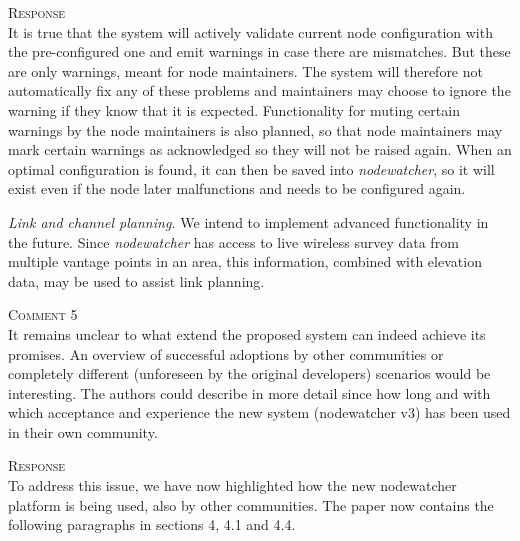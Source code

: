 \documentclass[12pt,twoside,a4paper]{report}
\newcommand{\nodewatcher}{\textit{nodewatcher}}
\begin{document}
\vspace{0.5cm}\noindent\textsc{Response}\\
It is true that the system will actively validate current node configuration with the pre-configured one and emit warnings in case there are mismatches.
But these are only warnings, meant for node maintainers.
The system will therefore not automatically fix any of these problems and maintainers may choose to ignore the warning if they know that it is expected.
Functionality for muting certain warnings by the node maintainers is also planned, so that node maintainers may mark certain warnings as acknowledged so they will not be raised again.
When an optimal configuration is found, it can then be saved into \nodewatcher{}, so it will exist even if the node later malfunctions and needs to be configured again.

\textit{Link and channel planning.} We intend to implement advanced functionality in the future.
Since \nodewatcher{} has access to live wireless survey data from multiple vantage points in an area, this information, combined with elevation data, may be used to assist link planning.

\vspace{0.5cm}\noindent\textsc{Comment 5}\\
It remains unclear to what extend the proposed system can indeed achieve its promises. An overview of successful adoptions by other communities or completely different (unforeseen by the original developers) scenarios would be interesting. The authors could describe in more detail since how long and with which acceptance and experience the new system (nodewatcher v3) has been used in their own community.

\vspace{0.5cm}\noindent\textsc{Response}\\
To address this issue, we have now highlighted how the new nodewatcher platform is being used, also by other communities.
The paper now contains the following paragraphs in sections 4, 4.1 and 4.4.
\end{document}
